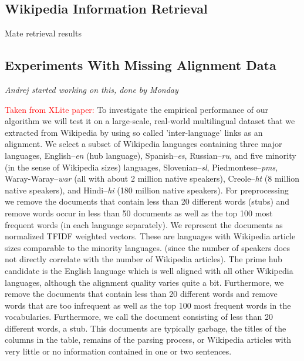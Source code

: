 \documentclass[twoside,11pt]{article}
\newcommand{\oldText}[1]{\textcolor{red}{#1:}\color{blue}}
\begin{document}
\subsection{Wikipedia Information Retrieval}

Mate retrieval results

\subsection{Experiments With Missing Alignment Data}
\emph{Andrej started working on this, done by Monday}
{\oldText{Taken from XLite paper}
To investigate the empirical performance of our algorithm we will test it on a large-scale, real-world multilingual dataset that we extracted from Wikipedia  by  using so called 'inter-language' links as an alignment. We select a subset of Wikipedia languages containing three major languages, English--\emph{en} (hub language), Spanish--\emph{es}, Russian--\emph{ru}, and five minority (in the sense of Wikipedia sizes) languages, Slovenian--\emph{sl}, Piedmontese--\emph{pms}, Waray-Waray--\emph{war} (all with about 2 million native speakers), Creole--\emph{ht} (8 million native speakers), and Hindi--\emph{hi} (180 million native speakers). For preprocessing we remove the documents that contain less than 20 different words (stubs) and remove words occur in less than 50 documents as well as the top 100 most frequent words (in each language separately). We represent the documents as normalized TFIDF\cite{Salton88term-weightingapproaches} weighted vectors. These are languages with Wikipedia article sizes comparable to the minority languages.  (since the number of speakers does not directly correlate with the number of Wikipedia articles). The prime hub candidate is the English language which is well aligned with all other Wikipedia languages, although the alignment quality varies quite a bit. Furthermore, we remove the documents that contain less than 20 different words and remove words that are too infrequent as well as the top 100 most frequent words in the vocabularies. Furthermore, we call the document consisting of less than 20 different words, a stub. This documents are typically garbage, the titles of the columns in the table, remains of the parsing process, or Wikipedia articles with very little or no information contained in one or two sentences.

}
\end{document}
